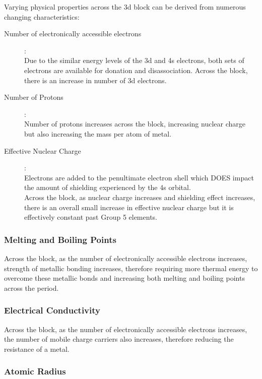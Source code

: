 \documentclass[../main]{subfiles}
\begin{document}
	Varying physical properties across the 3d block can be derived from numerous changing characteristics:

	\begin{description}
	\item[Number of electronically accessible electrons]:\\
		Due to the similar energy levels of the 3d and 4s electrons, both sets of electrons are available for donation and disassociation. Across the block, there is an increase in number of 3d electrons.
	\item[Number of Protons]:\\
		Number of protons increases across the block, increasing nuclear charge but also increasing the mass per atom of metal. 
	\item[Effective Nuclear Charge]:\\
		Electrons are added to the penultimate electron shell which DOES impact the amount of shielding experienced by the 4s orbital. \\
		Across the block, as nuclear charge increases and shielding effect increases, there is an overall small increase in effective nuclear charge but it is effectively constant past Group 5 elements.
	\end{description}

	\subsubsection{Melting and Boiling Points}

	Across the block, as the number of electronically accessible electrons increases, strength of metallic bonding increases, therefore requiring more thermal energy to overcome these metallic bonds and increasing both melting and boiling points across the period. \\

	\subsubsection{Electrical Conductivity}

	Across the block, as the number of electronically accessible electrons increases, the number of mobile charge carriers also increases, therefore reducing the resistance of a metal. \\

	\subsubsection{Atomic Radius}
\end{document}
